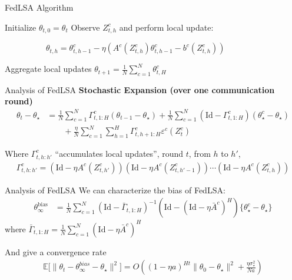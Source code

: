 \documentclass[aspectratio=169,14pt]{beamer}
\begin{document}
\begin{frame}{FedLSA Algorithm}
  \begin{algorithmic}
    \State Initialize $\theta_{t,0} = \theta_t$
    \State Observe $Z^c_{t,h}$ and perform local update:
    \begin{center}
      ~~~~~~~~~~$\theta_{t,h} = \theta_{t,h-1}^c - \eta( A^c(Z^c_{t,h}) \theta_{t,h-1}^c - b^c(Z^c_{t,h}))$
    \end{center}
    \EndFor
    \EndFor
    \State Aggregate local updates $\theta_{t+1} = \tfrac{1}{N} \sum\nolimits_{c=1}^{N} \theta_{t,H}^c $
    \EndFor
  \end{algorithmic}  
\end{frame}


\begin{frame}{Analysis of FedLSA}
  \textbf{Stochastic Expansion (over one communication round)}
  \begin{align*}
    \theta_{t} - \theta_\star
    & =
    \frac{1}{N} \sum_{c=1}^N \Gamma_{t,1:H}^c (\theta_{t-1} - \theta_\star)
    + \frac{1}{N} \sum_{c=1}^N (\text{Id} - \Gamma_{t,1:H}^c) (\theta_\star^c - \theta_\star)
    \\
    & \qquad + \frac{\eta}{N} \sum_{c=1}^N \sum_{h=1}^H \Gamma_{t,h+1:H}^c \varepsilon^c(Z_t^c)
  \end{align*}

  Where $\Gamma_{t,h:h'}^c$ ``accumulates local updates'', round $t$, from $h$ to $h'$,
  \begin{align*}
    \Gamma_{t,h:h'}^c = (\text{Id} - \eta A^c(Z^c_{t,h'})) (\text{Id} - \eta A^c(Z^c_{t,h'-1})) \cdots (\text{Id} - \eta A^c(Z^c_{t,h}))
  \end{align*}  
\end{frame}


\begin{frame}{Analysis of FedLSA}
  We can characterize the bias of FedLSA:
  \begin{align*}
    \theta_\infty^{\text{bias}}
    & =
      \frac{1}{N}
      \sum_{c=1}^N
      (\text{Id} - \bar{\Gamma}_{t,1:H})^{-1} 
      (\text{Id} - (\text{Id}- \eta \bar{A}^c)^H)\{ \theta_\star^c - \theta_\star \}
  \end{align*}
  where $\bar{\Gamma}_{t,1:H} = \tfrac{1}{N} \sum_{c=1}^N (\text{Id} - \eta \bar{A}^c)^H$

  \pause

  \vspace{1em}
  
  And give a convergence rate
  \begin{align*}
    \mathbb{E} \Big[ \| {\theta_t - \theta^{bias}_{\infty} - \theta_\star} \|^2 \Big]
    =
    O\left(
    (1 - \eta a)^{H t} \| \theta_0 - \theta_\star \|^2
    + \frac{\eta \sigma_\star^2}{N a}
    \right)
  \end{align*}
\end{frame}
\end{document}
